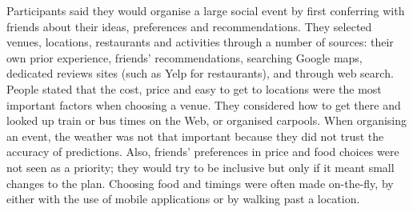 \documentclass{sigchi}
\begin{document}
Participants said they would organise a large social event by first conferring with friends about their ideas, preferences and recommendations.  They selected venues, locations, restaurants and activities through a number of sources: their own prior experience, friends' recommendations, searching Google maps, dedicated reviews sites (such as Yelp for restaurants), and through web search.  People stated that the cost, price and easy to get to locations were the most important factors when choosing a venue.  They considered how to get there and looked up train or bus times on the Web, or organised carpools.  When organising an event, the weather was not that important because they did not trust the accuracy of predictions.  Also, friends' preferences in price and food choices were not seen as a priority; they would try to be inclusive but only if it meant small changes to the plan.  Choosing food and timings were often made on-the-fly, by either with the use of mobile applications or by walking past a location.

\end{document}
